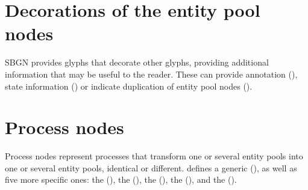 








\section{Decorations of the entity pool nodes}\label{sec:decorations}

SBGN \PD provides glyphs that decorate other glyphs, providing additional information that may be useful to the reader. These can provide annotation (), state information () or indicate duplication of entity pool nodes ().







\section{Process nodes}\label{sec:PNs}
 
Process nodes represent processes that transform one or several entity pools into one or several entity pools, identical or different.  \SBGNPDLone defines a generic  (), as well as five more specific ones: the  (), the  (), the  (), the  (), and the  (). 
 
